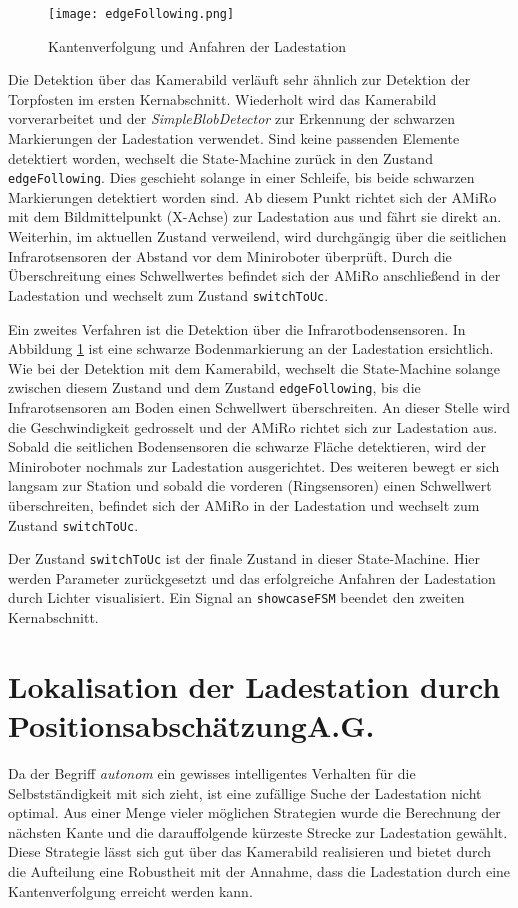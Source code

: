\begin{figure}[H]
	\begin{center}
		\texttt{[image: edgeFollowing.png]} 	
		\caption{Kantenverfolgung und Anfahren der Ladestation}
		\label{fig:edgeFollowing}
	\end{center}
\end{figure}

Die Detektion über das Kamerabild verläuft sehr ähnlich zur Detektion der Torpfosten im ersten Kernabschnitt. Wiederholt wird das Kamerabild vorverarbeitet und der \textit{SimpleBlobDetector} zur Erkennung der schwarzen Markierungen der Ladestation verwendet. Sind keine passenden Elemente detektiert worden, wechselt die State-Machine zurück in den Zustand \texttt{edgeFollowing}. Dies geschieht solange in einer Schleife, bis beide schwarzen Markierungen detektiert worden sind. Ab diesem Punkt richtet sich der AMiRo mit dem Bildmittelpunkt (X-Achse) zur Ladestation aus und fährt sie direkt an. Weiterhin, im aktuellen Zustand verweilend, wird durchgängig über die seitlichen Infrarotsensoren der Abstand vor dem Miniroboter überprüft. Durch die Überschreitung eines Schwellwertes befindet sich der AMiRo anschließend in der Ladestation und wechselt zum Zustand \texttt{switchToUc}.

Ein zweites Verfahren ist die Detektion über die Infrarotbodensensoren. In Abbildung \ref{fig:edgeFollowing} ist eine schwarze Bodenmarkierung an der Ladestation ersichtlich. Wie bei der Detektion mit dem Kamerabild, wechselt die State-Machine solange zwischen diesem Zustand und dem Zustand \texttt{edgeFollowing}, bis die Infrarotsensoren am Boden einen Schwellwert überschreiten. An dieser Stelle wird die Geschwindigkeit gedrosselt und der AMiRo richtet sich zur Ladestation aus. Sobald die seitlichen Bodensensoren die schwarze Fläche detektieren, wird der Miniroboter nochmals zur Ladestation ausgerichtet. Des weiteren bewegt er sich langsam zur Station und sobald die vorderen (Ringsensoren) einen Schwellwert überschreiten, befindet sich der AMiRo in der Ladestation und wechselt zum Zustand \texttt{switchToUc}.

Der Zustand \texttt{switchToUc} ist der finale Zustand in dieser State-Machine. Hier werden Parameter zurückgesetzt und das erfolgreiche Anfahren der Ladestation durch Lichter visualisiert. Ein Signal an \texttt{showcaseFSM} beendet den zweiten Kernabschnitt.

\section[Lokalisation der Ladestation durch Positionsabschätzung]{Lokalisation der Ladestation durch Positionsabschätzung\hfill {\normalsize A.G.}} \label{cha:Lokalisation der Ladestation}
Da der Begriff \textit{autonom} ein gewisses intelligentes Verhalten für die Selbstständigkeit mit sich zieht, ist eine zufällige Suche der Ladestation nicht optimal. Aus einer Menge vieler möglichen Strategien wurde die Berechnung der nächsten Kante und die darauffolgende kürzeste Strecke zur Ladestation gewählt. Diese Strategie lässt sich gut über das Kamerabild realisieren und bietet durch die Aufteilung eine Robustheit mit der Annahme, dass die Ladestation durch eine Kantenverfolgung erreicht werden kann.

